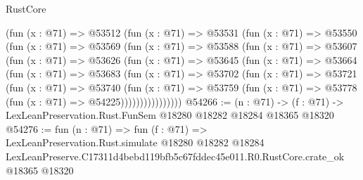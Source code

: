 \begin{lexlean}{RustCore}
\begin{coremodule}
    (fun (x : @71) =>
    @53512
      (fun (x : @71) =>
      @53531
        (fun (x : @71) =>
        @53550
          (fun (x : @71) =>
          @53569
            (fun (x : @71) =>
            @53588
              (fun (x : @71) =>
              @53607
                (fun (x : @71) =>
                @53626
                  (fun (x : @71) =>
                  @53645
                    (fun (x : @71) =>
                    @53664
                      (fun (x : @71) =>
                      @53683
                        (fun (x : @71) =>
                        @53702
                          (fun (x : @71) =>
                          @53721
                            (fun (x : @71) =>
                            @53740
                              (fun (x : @71) =>
                              @53759
                                (fun (x : @71) => @53778 (fun (x : @71) => @54225))))))))))))))))
@54266 := (n : @71) ->
  (f : @71) -> LexLeanPreservation.Rust.FunSem @18280 @18282 @18284 @18365 @18320
@54276 := fun (n : @71) =>
  fun (f : @71) =>
  LexLeanPreservation.Rust.simulate
    @18280
    @18282
    @18284
    LexLeanPreserve.C17311d4bebd119bfb5c67fddec45e011.R0.RustCore.crate_ok
    @18365
    @18320
\end{coremodule}
\end{lexlean}
